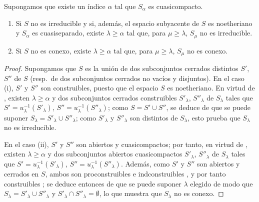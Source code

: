 \begin{proposition}[8.4.1]
\label{IV.8.4.1-fr}
Supongamos que existe un índice $\alpha$ tal que $S_\alpha$ es cuasicompacto.
\begin{enumerate}[label=\textup{(\roman*)}]
  \item Si $S$ no es irreducible y si, además, el espacio subyacente de $S$ es noetheriano y $S_\alpha$ es cuasiseparado, existe $\lambda\geq\alpha$ tal que, para $\mu\geq\lambda$, $S_\mu$ no es irreducible.
  \item Si $S$ no es conexo, existe $\lambda\geq\alpha$ tal que, para $\mu\geq\lambda$, $S_\mu$ no es conexo.
\end{enumerate}
\end{proposition}

\begin{proof}
Supongamos que $S$ es la unión de dos subconjuntos cerrados distintos $S'$, $S''$ de $S$ (resp.\ de dos subconjuntos cerrados no vacíos y disjuntos).
En el caso (i), $S'$ y $S''$ son construibles, puesto que el espacio $S$ es noetheriano.
En virtud de , existen $\lambda\geq\alpha$ y dos subconjuntos cerrados construibles $S'_\lambda$, $S''_\lambda$ de $S_\lambda$ tales que $S'=u_\lambda^{-1}(S'_\lambda)$, $S''=u_\lambda^{-1}(S''_\lambda)$; como $S=S'\cup S''$, se deduce de  que se puede suponer $S_\lambda=S'_\lambda\cup S''_\lambda$; como $S'_\lambda$ y $S''_\lambda$ son distintos de $S_\lambda$, esto prueba que $S_\lambda$ no es irreducible.

En el caso (ii), $S'$ y $S''$ son abiertos y cuasicompactos; por tanto, en virtud de , existen $\lambda\geq\alpha$ y dos subconjuntos abiertos cuasicompactos $S'_\lambda$, $S''_\lambda$ de $S_\lambda$ tales que $S'=u_\lambda^{-1}(S'_\lambda)$, $S''=u_\lambda^{-1}(S''_\lambda)$.
Además, como $S'$ y $S''$ son abiertos y cerrados en $S$, ambos son proconstruibles e indconstruibles , y por tanto construibles ; se deduce entonces de  que se puede suponer $\lambda$ elegido de modo que $S_\lambda=S'_\lambda\cup S''_\lambda$ y $S'_\lambda\cap S''_\lambda=\emptyset$, lo que muestra que $S_\lambda$ no es conexo.
\end{proof}

